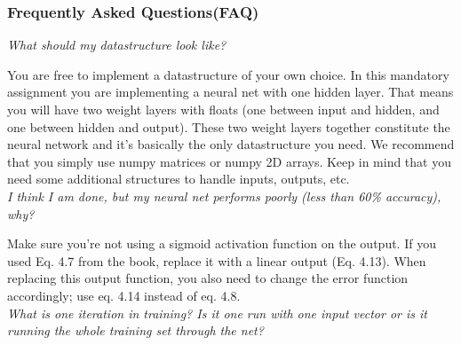 \documentclass{article}           %
\begin{document}
\subsubsection*{Frequently Asked Questions(FAQ)}
\textit{What should my datastructure look like?}

You are free to implement a datastructure of your own choice.
In this mandatory assignment you are implementing a neural net with one hidden layer.
That means you will have two weight layers with floats
(one between input and hidden, and one between hidden and output).
These two weight layers together constitute the neural network and it’s basically the only datastructure you need.
We recommend that you simply use numpy matrices or numpy 2D arrays.
Keep in mind that you need some additional structures to handle inputs, outputs, etc.\\

\noindent
\textit{I think I am done, but my neural net performs poorly (less than 60\% accuracy), why?}

Make sure you’re not using a sigmoid activation function on the output.
If you used Eq. 4.7 from the book, replace it with a linear output (Eq. 4.13).
When replacing this output function, you also need to change the error function accordingly;
use eq. 4.14 instead of eq. 4.8.\\

\noindent
\textit{What is one iteration in training?
Is it one run with one input vector or is it running the whole training set through the net?}
\end{document}
